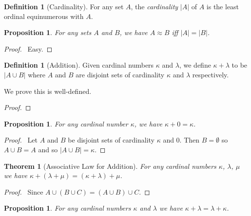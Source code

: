 \documentclass{book}
\let\qed\relax
\newtheorem{prop}[ax]{Proposition}
\newtheorem{thm}[ax]{Theorem}
\theoremstyle{definition}
\newtheorem{df}[ax]{Definition}
\begin{document}
\begin{df}[Cardinality]
For any set $A$, the \emph{cardinality} $|A|$ of $A$ is the least ordinal equinumerous with $A$.
\end{df}

\begin{prop}
For any sets $A$ and $B$, we have $A \approx B$ iff $|A| = |B|$.
\end{prop}

\begin{proof}
\pf\ Easy. \qed
\end{proof}

\begin{df}[Addition]
Given cardinal numbers $\kappa$ and $\lambda$, we define $\kappa + \lambda$ to be $|A \cup B|$ where $A$ and $B$ are disjoint sets of cardinality $\kappa$ and $\lambda$ respectively.

We prove this is well-defined.
\end{df}

\begin{proof}
\pf
{}
\qed
\end{proof}

\begin{prop}
For any cardinal number $\kappa$, we have $\kappa + 0 = \kappa$.
\end{prop}

\begin{proof}
\pf\ Let $A$ and $B$ be disjoint sets of cardinality $\kappa$ and 0. Then $B = \emptyset$ so $A \cup B = A$ and so $|A \cup B| = \kappa$. \qed
\end{proof}

\begin{thm}[Associative Law for Addition]
For any cardinal numbers $\kappa$, $\lambda$, $\mu$ we have $\kappa + (\lambda + \mu) = (\kappa + \lambda) + \mu$.
\end{thm}

\begin{proof}
\pf\ Since $A \cup (B \cup C) = (A \cup B) \cup C$. \qed
\end{proof}

\begin{prop}
For any cardinal numbers $\kappa$ and $\lambda$ we have $\kappa + \lambda = \lambda + \kappa$.
\end{prop}
\end{document}
